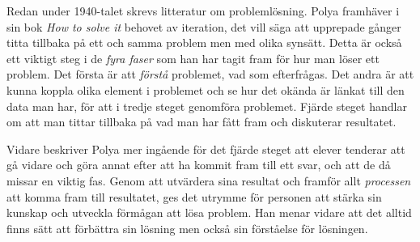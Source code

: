 \textcolor{Mahogany}{
    Redan under 1940-talet skrevs litteratur om problemlösning. Polya framhäver i sin bok \textsl{How to solve it} \cite{Polya} behovet av iteration, det vill säga att upprepade gånger titta tillbaka på ett och samma problem men med olika synsätt. Detta är också ett viktigt steg i de \textsl{fyra faser} som han har tagit fram för hur man löser ett problem.
    Det första är att \textsl{förstå} problemet, vad som efterfrågas. Det andra är att kunna koppla olika element i problemet och se hur det okända är länkat till den data man har, för att i tredje steget genomföra problemet. 
    Fjärde steget handlar om att man tittar tillbaka på vad man har fått fram och diskuterar resultatet.
}

\textcolor{Mahogany}{
    Vidare beskriver Polya mer ingående för det fjärde steget att elever tenderar att gå vidare och göra annat efter att ha kommit fram till ett svar, och att de då missar en viktig fas. Genom att utvärdera sina resultat och framför allt \textsl{processen} att komma fram till resultatet, ges det utrymme för personen att stärka sin kunskap och utveckla förmågan att lösa problem. Han menar vidare att det alltid finns sätt att förbättra sin lösning men också sin förståelse för lösningen.
}